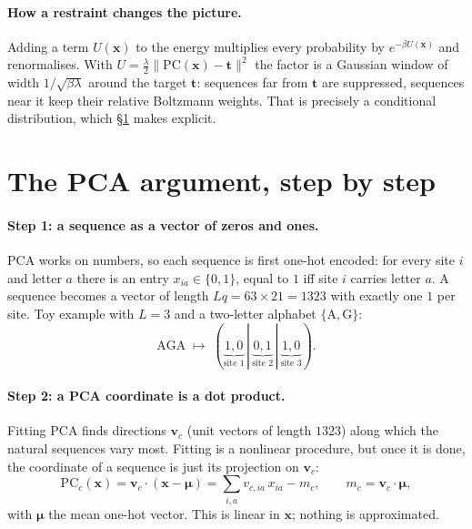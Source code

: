 \documentclass[10pt,a4paper]{article}
\newcommand{\PC}{\mathrm{PC}}
\begin{document}
\paragraph{How a restraint changes the picture.} Adding a term $U(\bm x)$ to the energy multiplies
every probability by $e^{-\beta U(\bm x)}$ and renormalises. With
$U=\frac{\lambda}{2}\|\PC(\bm x)-\bm t\|^2$ the factor is a Gaussian window of width $1/\sqrt{\beta\lambda}$
around the target $\bm t$: sequences far from $\bm t$ are suppressed, sequences near it keep their
relative Boltzmann weights. That is precisely a conditional distribution, which \S\ref{sec:pca}
makes explicit.

\section{The PCA argument, step by step}\label{sec:pca}
\paragraph{Step 1: a sequence as a vector of zeros and ones.} PCA works on numbers, so each
sequence is first one-hot encoded: for every site $i$ and letter $a$ there is an entry
$x_{ia}\in\{0,1\}$, equal to $1$ iff site $i$ carries letter $a$. A sequence becomes a vector of
length $Lq=63\times21=1323$ with exactly one $1$ per site. Toy example with $L=3$ and a two-letter
alphabet $\{\mathrm A,\mathrm G\}$:
\[
\mathrm{AGA}\;\mapsto\;(\underbrace{1,0}_{\text{site 1}}\,|\,\underbrace{0,1}_{\text{site 2}}\,|\,
\underbrace{1,0}_{\text{site 3}}).
\]

\paragraph{Step 2: a PCA coordinate is a dot product.} Fitting PCA finds directions $\bm v_c$ (unit
vectors of length $1323$) along which the natural sequences vary most. Fitting is a nonlinear
procedure, but once it is done, the coordinate of a sequence is just its projection on $\bm v_c$:
\begin{equation}
\PC_c(\bm x)=\bm v_c\cdot(\bm x-\bm\mu)=\sum_{i,a}v_{c,ia}\,x_{ia}-m_c,\qquad m_c=\bm v_c\cdot\bm\mu ,
\end{equation}
with $\bm\mu$ the mean one-hot vector. This is linear in $\bm x$; nothing is approximated.
\end{document}
